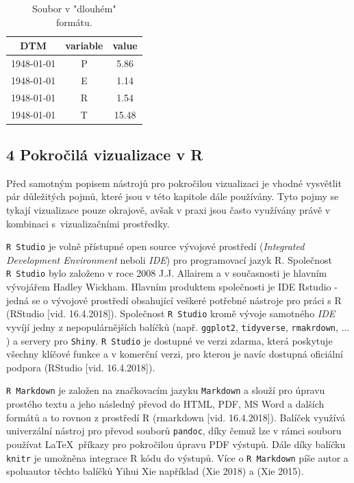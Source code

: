 \documentclass[12pt,]{article}
\begin{document}
\begin{minipage}[c]{0.14\textwidth}
\end{minipage}\begin{minipage}[c]{0.39\textwidth}
\begin{table}[H]
\begin{tabular}{|ccc|}
  \hline
DTM & variable & value \\ 
  \hline
1948-01-01 & P & 5.86 \\ 
1948-01-01 & E & 1.14 \\ 
1948-01-01 & R & 1.54 \\ 
1948-01-01 & T & 15.48 \\ 
   \hline
\end{tabular}
\caption{Soubor v "dlouhém" \\ formátu.}
\label{tab4}
\end{table}
\end{minipage}

\newpage

\hypertarget{pokrocila}{\subsection{4 Pokročilá vizualizace v
R}\label{pokrocila}}

\qquad Před samotným popisem nástrojů pro pokročilou vizualizaci je
vhodné vysvětlit pár důležitých pojmů, které jsou v této kapitole dále
používány. Tyto pojmy se tykají vizualizace pouze okrajově, avšak v
praxi jsou často využívány právě v kombinaci s~vizualizačními
prostředky.

\qquad \texttt{R\ Studio} je volně přístupné open source vývojové
prostředí (\emph{Integrated Development Environment} neboli \emph{IDE})
pro programovací jazyk R. Společnost \texttt{R\ Studio} bylo založeno v
roce 2008 J.J. Allairem a v současnosti je hlavním vývojářem Hadley
Wickham. Hlavním produktem společnosti je IDE Rstudio - jedná se o
vývojové prostředí obsahující veškeré potřebné nástroje pro práci s R
(RStudio {[}vid. 16.4.2018{]}). Společnost \texttt{R\ Studio} kromě
vývoje samotného \emph{IDE} vyvíjí jedny z nepopulárnějších balíčků
(např. \texttt{ggplot2}, \texttt{tidyverse}, \texttt{rmakrdown},
\(\dots\)) a servery pro \texttt{Shiny}. \texttt{R\ Studio} je dostupné
ve verzi zdarma, která poskytuje všechny klíčové funkce a v komerční
verzi, pro kterou je navíc dostupná oficiální podpora (RStudio {[}vid.
16.4.2018{]}).

\qquad \texttt{R\ Markdown} je založen na značkovacím jazyku
\texttt{Markdown} a slouží pro úpravu prostého textu a jeho následný
převod do HTML, PDF, MS Word a dalších formátů a to rovnou z prostředí R
(rmarkdown {[}vid. 16.4.2018{]}). Balíček využívá univerzální nástroj
pro převod souborů \texttt{pandoc}, díky čemuž lze v rámci souboru
používat \LaTeX ~příkazy pro pokročilou úpravu PDF výstupů. Dále díky
balíčku \texttt{knitr} je umožněna integrace R kódu do výstupů. Více o
\texttt{R\ Markdown} píše autor a spoluautor těchto balíčků Yihui Xie
například (Xie 2018) a (Xie 2015).
\end{document}
